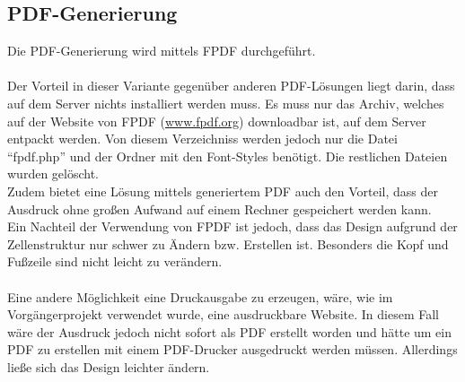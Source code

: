 \subsection{PDF-Generierung}
Die PDF-Generierung wird mittels FPDF durchgeführt.\\
\\
Der Vorteil in dieser Variante gegenüber anderen PDF-Lösungen liegt darin, dass auf dem Server nichts installiert werden muss. Es muss nur das Archiv, welches auf der Website von FPDF (\href{www.fpdf.org}{www.fpdf.org}) downloadbar ist, auf dem Server entpackt werden. Von diesem Verzeichniss werden jedoch nur die Datei \enquote{fpdf.php} und der Ordner mit den Font-Styles benötigt. Die restlichen Dateien wurden gelöscht.\\
Zudem bietet eine Lösung mittels generiertem PDF auch den Vorteil, dass der Ausdruck ohne großen Aufwand auf einem Rechner gespeichert werden kann.
\\
Ein Nachteil der Verwendung von FPDF ist jedoch, dass das Design aufgrund der Zellenstruktur nur schwer zu Ändern bzw. Erstellen ist. Besonders die Kopf und Fußzeile sind nicht leicht zu verändern.\\\\
Eine andere Möglichkeit eine Druckausgabe zu erzeugen, wäre, wie im Vorgängerprojekt verwendet wurde, eine ausdruckbare Website. In diesem Fall wäre der Ausdruck jedoch nicht sofort als PDF erstellt worden und hätte um ein PDF zu erstellen mit einem PDF-Drucker ausgedruckt werden müssen. Allerdings ließe sich das Design leichter ändern.

